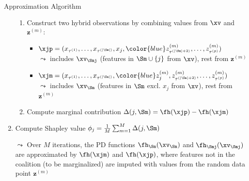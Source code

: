 \documentclass[11pt,compress,t,notes=noshow, aspectratio=169, xcolor=table]{beamer}
\begin{document}
\begin{frame}{Approximation Algorithm }
\begin{enumerate}[<+->]
\begin{enumerate}
        \item Construct two hybrid observations by combining values from $\xv$ and {\color{blue} $\mathbf{z}^{(m)}$}:
\begin{itemize}
\setlength\itemsep{0.5em}
  \item $
  \xjp = (x_{\tau^{(1)}}, \ldots, x_{\tau^{(|\Sm|)}}, x_j, 
          {\color{blue}z_{\tau^{(|\Sm|+2)}}^{(m)}, \ldots, z_{\tau^{(p)}}^{(m)}})
  $\\
  $\leadsto$ includes $\xv_{\Smj}$ (features in $\Sm \cup \{j\}$ from $\xv$), rest from {\color{blue} $\mathbf{z}^{(m)}$}
  
  \item $
  \xjm = (x_{\tau^{(1)}}, \ldots, x_{\tau^{(|\Sm|)}}, 
          {\color{blue}z_j^{(m)}, z_{\tau^{(|\Sm|+2)}}^{(m)}, \ldots, z_{\tau^{(p)}}^{(m)}})
  $\\
   $\leadsto$ includes $\xv_{\Sm}$ (features in $\Sm$ excl. $x_j$ from $\xv$), rest from {\color{blue} $\mathbf{z}^{(m)}$}
\end{itemize}
        \item Compute marginal contribution $\Delta(j, \Sm) = \fh(\xjp) - \fh(\xjm)$ %
        \end{enumerate}
        
    \item Compute Shapley value $\phi_j = \frac{1}{M}\sum_{m=1}^M \Delta(j, \Sm)$ %
    \item[$\leadsto$] Over $M$ iterations, the PD functions $\fh_{\Sm}(\xv_{\Sm})$ and $\fh_{\Smj}(\xv_{\Smj})$ are approximated by $\fh(\xjm)$ and $\fh(\xjp)$, where features not in the coalition (to be marginalized) are imputed with values from the random data point {\color{blue} $\mathbf{z}^{(m)}$}
  \end{enumerate}
   

\end{frame}
\end{document}
